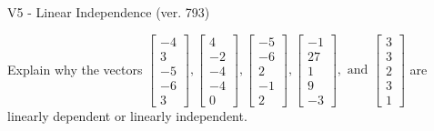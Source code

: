 \begin{exercise}
  \begin{exerciseTitle}V5 - Linear Independence (ver. 793)\end{exerciseTitle}
  \begin{exerciseStatement}
    Explain why the vectors \(\left[\begin{array}{r}
-4 \\
3 \\
-5 \\
-6 \\
3
\end{array}\right] , \left[\begin{array}{r}
4 \\
-2 \\
-4 \\
-4 \\
0
\end{array}\right] , \left[\begin{array}{r}
-5 \\
-6 \\
2 \\
-1 \\
2
\end{array}\right] , \left[\begin{array}{r}
-1 \\
27 \\
1 \\
9 \\
-3
\end{array}\right] , \text{ and } \left[\begin{array}{r}
3 \\
3 \\
2 \\
3 \\
1
\end{array}\right]\) are linearly dependent or linearly independent.	



\end{exerciseStatement}
\end{exercise}
